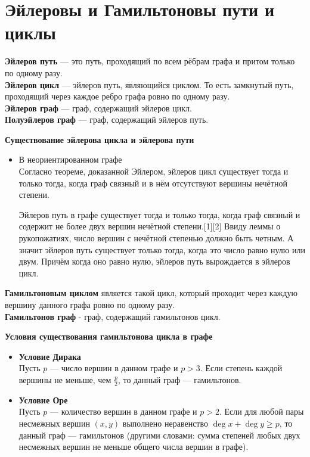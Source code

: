\section{Эйлеровы и Гамильтоновы пути и циклы}


\textbf{Эйлеров путь} — это путь, проходящий по всем рёбрам графа и притом только по одному разу. \\
\textbf{Эйлеров цикл} — эйлеров путь, являющийся циклом. То есть замкнутый путь, проходящий через каждое ребро графа ровно по одному разу.\\
\textbf{Эйлеров граф} — граф, содержащий эйлеров цикл.\\
\textbf{Полуэйлеров граф} — граф, содержащий эйлеров путь.\\
\begin{center}
	\textbf{Существование эйлерова цикла и эйлерова пути}
\end{center}
\begin{itemize}
	\item В неориентированном графе\\
	Согласно теореме, доказанной Эйлером, эйлеров цикл существует тогда и только тогда, когда граф связный и в нём отсутствуют вершины нечётной степени.
	
	Эйлеров путь в графе существует тогда и только тогда, когда граф связный и содержит не более двух вершин нечётной степени.[1][2] Ввиду леммы о рукопожатиях, число вершин с нечётной степенью должно быть четным. А значит эйлеров путь существует только тогда, когда это число равно нулю или двум. Причём когда оно равно нулю, эйлеров путь вырождается в эйлеров цикл.
\end{itemize}


\textbf{Гамильтоновым циклом} является такой цикл, который проходит через каждую вершину данного графа ровно по одному разу.\\
\textbf{Гамильтонов граф} - граф, содержащий гамильтонов цикл.\\
\begin{center}
	\textbf{Условия существования гамильтонова цикла в графе}
\end{center}
\begin{itemize}
	\item \textbf{Условие Дирака}\\
	Пусть $p$ — число вершин в данном графе и $p>3$. Если степень каждой вершины не меньше, чем $\frac{p}{2}$, то данный граф — гамильтонов. 
	
	\item \textbf{Условие Оре}\\	
	Пусть $p$ — количество вершин в данном графе и $p>2$. Если для любой пары несмежных вершин $(x, y)$ выполнено неравенство $\deg x + \deg y\geqslant p$, то данный граф — гамильтонов (другими словами: сумма степеней любых двух несмежных вершин не меньше общего числа вершин в графе).
\end{itemize}
